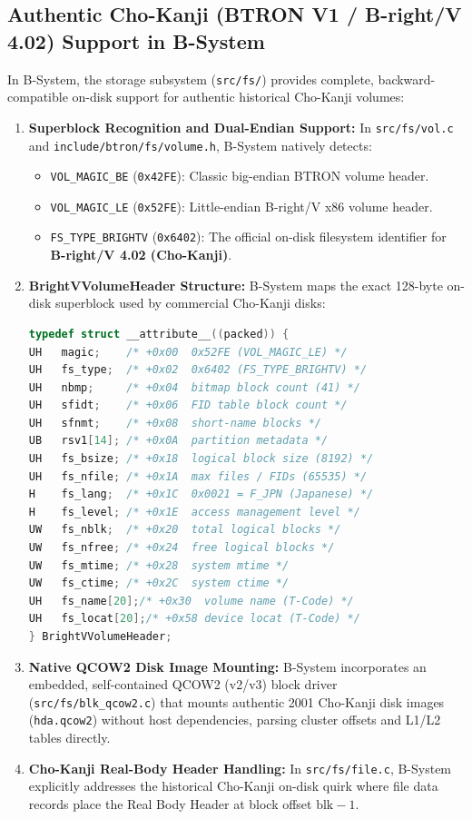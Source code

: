 \documentclass[10pt,journal,compsoc,twocolumn]{article}
\begin{document}
\subsection{Authentic Cho-Kanji (BTRON V1 / B-right/V 4.02) Support in B-System}
In B-System, the storage subsystem (\texttt{src/fs/}) provides complete, backward-compatible on-disk support for authentic historical Cho-Kanji volumes:
\begin{enumerate}[leftmargin=*]
    \item \textbf{Superblock Recognition and Dual-Endian Support:} In \texttt{src/fs/vol.c} and \texttt{include/btron/fs/volume.h}, B-System natively detects:
    \begin{itemize}
        \item \texttt{VOL\_MAGIC\_BE} (\texttt{0x42FE}): Classic big-endian BTRON volume header.
        \item \texttt{VOL\_MAGIC\_LE} (\texttt{0x52FE}): Little-endian B-right/V x86 volume header.
        \item \texttt{FS\_TYPE\_BRIGHTV} (\texttt{0x6402}): The official on-disk filesystem identifier for \textbf{B-right/V 4.02 (Cho-Kanji)}.
    \end{itemize}
    \item \textbf{BrightVVolumeHeader Structure:} B-System maps the exact 128-byte on-disk superblock used by commercial Cho-Kanji disks:
    \begin{lstlisting}[language=C]
typedef struct __attribute__((packed)) {
UH   magic;    /* +0x00  0x52FE (VOL_MAGIC_LE) */
UH   fs_type;  /* +0x02  0x6402 (FS_TYPE_BRIGHTV) */
UH   nbmp;     /* +0x04  bitmap block count (41) */
UH   sfidt;    /* +0x06  FID table block count */
UH   sfnmt;    /* +0x08  short-name blocks */
UB   rsv1[14]; /* +0x0A  partition metadata */
UH   fs_bsize; /* +0x18  logical block size (8192) */
UH   fs_nfile; /* +0x1A  max files / FIDs (65535) */
H    fs_lang;  /* +0x1C  0x0021 = F_JPN (Japanese) */
H    fs_level; /* +0x1E  access management level */
UW   fs_nblk;  /* +0x20  total logical blocks */
UW   fs_nfree; /* +0x24  free logical blocks */
UW   fs_mtime; /* +0x28  system mtime */
UW   fs_ctime; /* +0x2C  system ctime */
UH   fs_name[20];/* +0x30  volume name (T-Code) */
UH   fs_locat[20];/* +0x58 device locat (T-Code) */
} BrightVVolumeHeader;
    \end{lstlisting}
    \item \textbf{Native QCOW2 Disk Image Mounting:} B-System incorporates an embedded, self-contained QCOW2 (v2/v3) block driver (\texttt{src/fs/blk\_qcow2.c}) that mounts authentic 2001 Cho-Kanji disk images (\texttt{hda.qcow2}) without host dependencies, parsing cluster offsets and L1/L2 tables directly.
    \item \textbf{Cho-Kanji Real-Body Header Handling:} In \texttt{src/fs/file.c}, B-System explicitly addresses the historical Cho-Kanji on-disk quirk where file data records place the Real Body Header at block offset $\text{blk} - 1$.
\end{enumerate}
\end{document}
